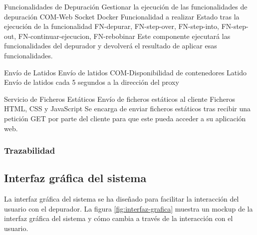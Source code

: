 \begin{component}{Funcionalidades de Depuración}
{Gestionar la ejecución de las funcionalidades de depuración}
{COM-Web Socket Docker} %
{Funcionalidad a realizar} %
{Estado tras la ejecución de la funcionalidad} %
{FN-depurar, FN-step-over, FN-step-into, FN-step-out, FN-continuar-ejecucion, FN-rebobinar} %
Este componente ejecutará las funcionalidades del depurador y devolverá el resultado de aplicar esas funcionalidades. %
\end{component}

\begin{component}{Envío de Latidos}
{Envío de latidos}
{COM-Disponibilidad de contenedores} %
{\NA} %
{Latido} %
{\NA} %
Envío de latidos cada 5 segundos a la dirección del proxy
\end{component}

\begin{component}{Servicio de Ficheros Estáticos}
{Envío de ficheros estáticos al cliente}
{\NA}
{Ficheros HTML, CSS y JavaScript}
{\NA} %
{Se encarga de enviar ficheros estáticos tras recibir una petición GET por parte del cliente para que este pueda acceder a su aplicación web.}
\end{component}

\FloatBarrier

\subsubsection{Trazabilidad} {\label{subsubsec:trazabilidad-comp}}

\begin{table}[htb]
      {\traceabilityCompFN}
  \end{table}


\subsection{Interfaz gráfica del sistema} \label{sec:interfaz-grafica}
La interfaz gráfica del sistema se ha diseñado para facilitar la interacción del usuario con el depurador. La figura \ref{fig:interfaz-grafica} muestra un mockup de la interfaz gráfica del sistema y cómo cambia a través de la interacción con el usuario.



